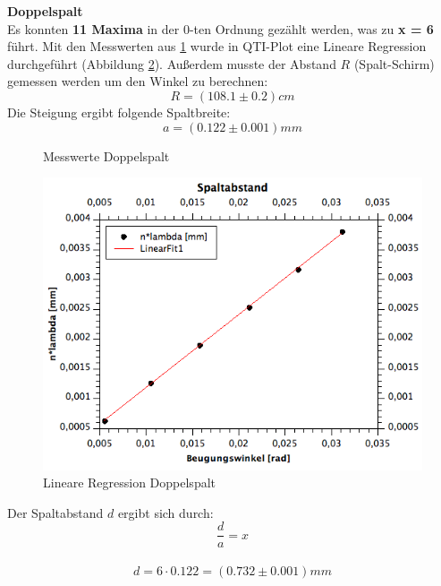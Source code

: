 \documentclass[12pt,a4paper]{article}
\begin{document}
\begin{multicols}{2}
\noindent
\textbf{Doppelspalt}\\
Es konnten \textbf{11 Maxima} in der 0-ten Ordnung gezählt werden, was zu \textbf{x = 6} führt. 
Mit den Messwerten aus \ref{tab:werte_doppelspalt} wurde in QTI-Plot eine Lineare Regression durchgeführt (Abbildung \ref{fig:doppelspalt_linreg}). 
Außerdem musste der Abstand $R$ (Spalt-Schirm) gemessen werden um den Winkel zu berechnen:
$$R = (108.1 \pm 0.2)cm$$
Die Steigung ergibt folgende Spaltbreite:
$$a = (0.122 \pm 0.001)mm$$
\begin{figure}[H]
	\centering
	\caption{Messwerte Doppelspalt}
	\label{tab:werte_doppelspalt}
\end{figure}
\begin{figure}[H]
	\centering
	\includegraphics[scale=0.4]{./figure/linreg_doppelspalt.png}
	\caption{Lineare Regression Doppelspalt}
	\label{fig:doppelspalt_linreg}
\end{figure}
\noindent
Der Spaltabstand $d$ ergibt sich durch:
$$\frac{d}{a} = x$$
\noindent
\\
$$d = 6\cdot 0.122 = (0.732 \pm 0.001)mm$$


\end{multicols}
\end{document}
